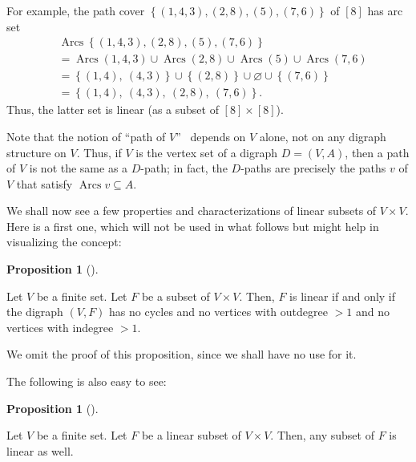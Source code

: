 \documentclass[numbers=enddot,12pt,final,onecolumn,notitlepage]{scrartcl}%
\numberwithin{exer}{section}
\theoremstyle{definition}
\newtheorem{prop}[theo]{Proposition}
\newenvironment{proposition}[1][]
{\begin{prop}[#1]\begin{leftbar}}
{\end{leftbar}\end{prop}}
\begin{document}
For example, the path cover $\left\{  \left(  1,4,3\right)  ,\left(
2,8\right)  ,\left(  5\right)  ,\left(  7,6\right)  \right\}  $ of $\left[
8\right]  $ has arc set
\begin{align*}
&  \operatorname*{Arcs}\left\{  \left(  1,4,3\right)  ,\left(  2,8\right)
,\left(  5\right)  ,\left(  7,6\right)  \right\} \\
&  =\operatorname*{Arcs}\left(  1,4,3\right)  \cup\operatorname*{Arcs}\left(
2,8\right)  \cup\operatorname*{Arcs}\left(  5\right)  \cup\operatorname*{Arcs}%
\left(  7,6\right) \\
&  =\left\{  \left(  1,4\right)  ,\ \left(  4,3\right)  \right\}  \cup\left\{
\left(  2,8\right)  \right\}  \cup\varnothing\cup\left\{  \left(  7,6\right)
\right\} \\
&  =\left\{  \left(  1,4\right)  ,\ \left(  4,3\right)  ,\ \left(  2,8\right)
,\ \left(  7,6\right)  \right\}  .
\end{align*}
Thus, the latter set is linear (as a subset of $\left[  8\right]
\times\left[  8\right]  $).

Note that the notion of \textquotedblleft path of $V$\textquotedblright%
\ depends on $V$ alone, not on any digraph structure on $V$. Thus, if $V$ is
the vertex set of a digraph $D=\left(  V,A\right)  $, then a path of $V$ is
not the same as a $D$-path; in fact, the $D$-paths are precisely the paths $v$
of $V$ that satisfy $\operatorname*{Arcs}v\subseteq A$.

We shall now see a few properties and characterizations of linear subsets of
$V\times V$. Here is a first one, which will not be used in what follows but
might help in visualizing the concept:

\begin{proposition}
Let $V$ be a finite set. Let $F$ be a subset of $V\times V$. Then, $F$ is
linear if and only if the digraph $\left(  V,F\right)  $ has no cycles and no
vertices with outdegree $>1$ and no vertices with indegree $>1$.
\end{proposition}

We omit the proof of this proposition, since we shall have no use for it.

The following is also easy to see:

\begin{proposition}
\label{prop.linear.subset}Let $V$ be a finite set. Let $F$ be a linear subset
of $V\times V$. Then, any subset of $F$ is linear as well.
\end{proposition}
\end{document}
